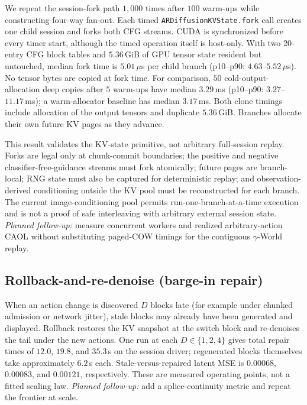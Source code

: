 \documentclass[11pt]{article}
\newcommand{\planned}[1]{\emph{Planned follow-up:} #1}
\newcommand{\caol}{CAOL}
\begin{document}
We repeat the session-fork path $1{,}000$ times after $100$ warm-ups while constructing four-way fan-out. Each timed \texttt{ARDiffusionKVState.fork} call creates one child session and forks both CFG streams. CUDA is synchronized before every timer start, although the timed operation itself is host-only. With two $20$-entry CFG block tables and $5.36$\,GiB of GPU tensor state resident but untouched, median fork time is $5.01\,\mu$s per child branch (p10--p90: $4.63$--$5.52\,\mu$s). No tensor bytes are copied at fork time. For comparison, $50$ cold-output-allocation deep copies after $5$ warm-ups have median $3.29$\,ms (p10--p90: $3.27$--$11.17$\,ms); a warm-allocator baseline has median $3.17$\,ms. Both clone timings include allocation of the output tensors and duplicate $5.36$\,GiB. Branches allocate their own future KV pages as they advance.

This result validates the KV-state primitive, not arbitrary full-session replay. Forks are legal only at chunk-commit boundaries; the positive and negative classifier-free-guidance streams must fork atomically; future pages are branch-local; RNG state must also be captured for deterministic replay; and observation-derived conditioning outside the KV pool must be reconstructed for each branch. The current image-conditioning pool permits run-one-branch-at-a-time execution and is not a proof of safe interleaving with arbitrary external session state. \planned{measure concurrent workers and realized arbitrary-action \caol{} without substituting paged-COW timings for the contiguous $\gamma$-World replay.}

\subsection{Rollback-and-re-denoise (barge-in repair)}
\label{sec:rollback}

When an action change is discovered $D$ blocks late (for example under chunked admission or network jitter), stale blocks may already have been generated and displayed. Rollback restores the KV snapshot at the switch block and re-denoises the tail under the new actions. One run at each $D\in\{1,2,4\}$ gives total repair times of $12.0$, $19.8$, and $35.3$\,s on the session driver; regenerated blocks themselves take approximately $6.2$\,s each. Stale-versus-repaired latent MSE is $0.00068$, $0.00083$, and $0.00121$, respectively. These are measured operating points, not a fitted scaling law. \planned{add a splice-continuity metric and repeat the frontier at scale.}
\end{document}
